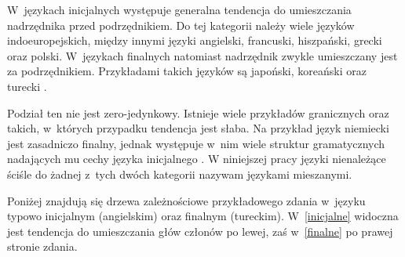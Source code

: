 W~językach inicjalnych występuje generalna tendencja do umieszczania nadrzędnika przed podrzędnikiem. Do tej kategorii należy wiele języków indoeuropejskich, między innymi języki angielski, francuski, hiszpański, grecki oraz polski. W~językach finalnych natomiast nadrzędnik zwykle umieszczany jest za podrzędnikiem. Przykładami takich języków są japoński, koreański oraz turecki \citep{polinsky2012headedness}.

Podział ten nie jest zero-jedynkowy. Istnieje wiele przykładów granicznych oraz takich, w~których przypadku tendencja jest słaba. Na przykład język niemiecki jest zasadniczo finalny, jednak występuje w~nim wiele struktur gramatycznych nadających mu cechy języka inicjalnego \citep{polinsky2012headedness}. W niniejszej pracy języki nienależące ściśle do żadnej z~tych dwóch kategorii nazywam językami mieszanymi.

Poniżej znajdują się drzewa zależnościowe przykładowego zdania w~języku typowo inicjalnym (angielskim) oraz finalnym (tureckim). W~\eqref{inicjalne} widoczna jest tendencja do umieszczania głów członów po lewej, zaś w~\eqref{finalne} po prawej stronie zdania.

